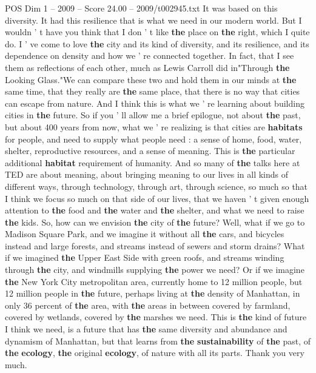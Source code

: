 \begin{textsample}{POS Dim 1 – 2009 – Score 24.00 – 2009/t002945.txt}
It was based on this diversity.
It had this resilience that is what we need in our modern world.
But I wouldn ' t have you think that I don ' t like \textbf{the} place on \textbf{the} right, which I quite do.
I ' ve come to love \textbf{the} city and its kind of diversity, and its resilience, and its dependence on density and how we ' re connected together.
In fact, that I see them as reflections of each other, much as Lewis Carroll did in"Through \textbf{the} Looking Glass."We can compare these two and hold them in our minds at \textbf{the} same time, that they really are \textbf{the} same place, that there is no way that cities can escape from nature.
And I think this is what we ' re learning about building cities in \textbf{the} future.
So if you ' ll allow me a brief epilogue, not about \textbf{the} past, but about 400 years from now, what we ' re realizing is that cities are \textbf{habitats} for people, and need to supply what people need : a sense of home, food, water, shelter, reproductive resources, and a sense of meaning.
This is \textbf{the} particular additional \textbf{habitat} requirement of humanity.
And so many of \textbf{the} talks here at TED are about meaning, about bringing meaning to our lives in all kinds of different ways, through technology, through art, through science, so much so that I think we focus so much on that side of our lives, that we haven ' t given enough attention to \textbf{the} food and \textbf{the} water and \textbf{the} shelter, and what we need to raise \textbf{the} kids.
So, how can we envision \textbf{the} city of \textbf{the} future?
Well, what if we go to Madison Square Park, and we imagine it without all \textbf{the} cars, and bicycles instead and large forests, and streams instead of sewers and storm drains?
What if we imagined \textbf{the} Upper East Side with green roofs, and streams winding through \textbf{the} city, and windmills supplying \textbf{the} power we need?
Or if we imagine \textbf{the} New York City metropolitan area, currently home to 12 million people, but 12 million people in \textbf{the} future, perhaps living at \textbf{the} density of Manhattan, in only 36 percent of \textbf{the} area, with \textbf{the} areas in between covered by farmland, covered by wetlands, covered by \textbf{the} marshes we need.
This is \textbf{the} kind of future I think we need, is a future that has \textbf{the} same diversity and abundance and dynamism of Manhattan, but that learns from \textbf{the} \textbf{sustainability} of \textbf{the} past, of \textbf{the} \textbf{ecology}, \textbf{the} original \textbf{ecology}, of nature with all its parts.
Thank you very much.

\end{textsample}
